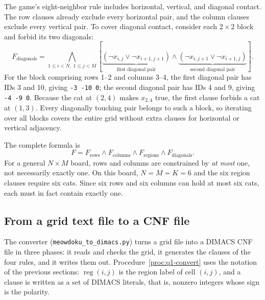 The game's eight-neighbor rule includes horizontal, vertical, and diagonal contact. The row clauses already exclude every horizontal pair, and the column clauses exclude every vertical pair. To cover diagonal contact, consider each $2\times2$ block and forbid its two diagonals:
\[
F_{\mathrm{diagonals}}=
\bigwedge_{1\le i<N,\;1\le j<M}
\left[
\underbrace{(\neg x_{i,j}\lor\neg x_{i+1,j+1})}_{\text{first diagonal pair}}
\land
\underbrace{(\neg x_{i,j+1}\lor\neg x_{i+1,j})}_{\text{second diagonal pair}}
\right].
\]
For the block comprising rows 1--2 and columns 3--4, the first diagonal pair has IDs 3 and 10, giving \texttt{-3 -10 0}; the second diagonal pair has IDs 4 and 9, giving \texttt{-4 -9 0}. Because the cat at $(2,4)$ makes $x_{2,4}$ true, the first clause forbids a cat at $(1,3)$. Every diagonally touching pair belongs to such a block, so iterating over all blocks covers the entire grid without extra clauses for horizontal or vertical adjacency.

The complete formula is
\[
F=F_{\mathrm{rows}}\land F_{\mathrm{columns}}
\land F_{\mathrm{regions}}\land F_{\mathrm{diagonals}}.
\]
For a general $N\times M$ board, rows and columns are constrained by \emph{at most} one, not necessarily exactly one. On this board, $N=M=K=6$ and the six region clauses require six cats. Since six rows and six columns can hold at most six cats, each must in fact contain exactly one.

\subsection{From a grid text file to a CNF file}

The converter (\texttt{meowdoku\_to\_dimacs.py}) turns a grid file into a DIMACS CNF file in three phases: it reads and checks the grid, it generates the clauses of the four rules, and it writes them out. Procedure~\ref{proc:q1-convert} uses the notation of the previous sections: $\operatorname{reg}(i,j)$ is the region label of cell $(i,j)$, and a clause is written as a set of DIMACS literals, that is, nonzero integers whose sign is the polarity.

